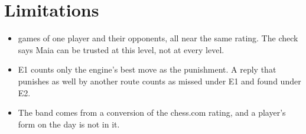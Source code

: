 \documentclass[11pt]{article}
\begin{document}
\section{Limitations}

\begin{itemize}[nosep]
\item \Games{} games of one player and their opponents, all near the same rating. The check says
Maia can be trusted at this level, not at every level.
\item E1 counts only the engine's best move as the punishment. A reply that punishes as well by
another route counts as missed under E1 and found under E2.
\item The band comes from a conversion of the chess.com rating, and a player's form on the day is
not in it.
\end{itemize}
\end{document}
